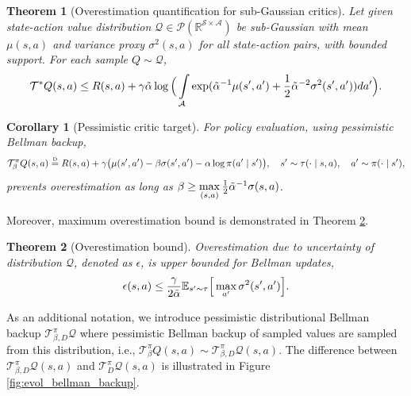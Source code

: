 \documentclass[10pt]{article} %
\newtheorem{theorem}{Theorem}[section]
\newtheorem{corollary}{Corollary}[theorem]
\newcommand\disteq{\mathrel{\stackrel{\makebox[0pt]{\mbox{\normalfont\tiny D}}}{=}}}
\begin{document}
\begin{theorem}[Overestimation quantification for sub-Gaussian critics]
	\label{thm:overestimation}
	Let given state-action value distribution $\mathcal{Q}\in\mathcal{P}(\mathbb{R}^{\mathcal{S}\times\mathcal{A}})$ be sub-Gaussian with mean $\mu(s,a)$ and variance proxy $\sigma^2(s,a)$ for all state-action pairs, with bounded support. For each sample $Q\sim\mathcal{Q}$,  
	\begin{equation}
		\mathcal{T}^{*} Q(s,a) \leq R(s,a) + \gamma \Tilde{\alpha} \log \Big( \int\limits_{\mathcal{A}} \exp( {\Tilde{\alpha}}^{-1} \mu(s',a') + \frac{1}{2} {\Tilde{\alpha}}^{-2} \sigma^2(s',a') ) da' \Big). \\
	\end{equation}
\end{theorem}

\begin{corollary}[Pessimistic critic target]
	\label{cor:pessimism}
	For policy evaluation, using pessimistic Bellman backup, 
	\begin{equation}
		\label{eqn:q_evs_eval_pessimistic}
		\mathcal{T}_{\beta}^{\pi} Q(s,a) \disteq R(s,a) + \gamma \big( \mu(s',a') - \beta \sigma(s',a') - \alpha \log \pi(a' \mid s') \big), \quad s'\sim\tau(\cdot \mid s,a), \quad a' \sim \pi(\cdot \mid s'), 
	\end{equation}
	prevents overestimation as long as $\beta \geq \max\limits_{(s, a)} \frac{1}{2}{\Tilde{\alpha}}^{-1} \sigma(s, a)$. 
\end{corollary}

Moreover, maximum overestimation bound is demonstrated in Theorem \ref{thm:overestimation_bound}.

\begin{theorem}[Overestimation bound]
	\label{thm:overestimation_bound}
	Overestimation due to uncertainty of distribution $\mathcal{Q}$, denoted as $\epsilon$, is upper bounded for Bellman updates, 
	\begin{align}
		\epsilon(s,a) \leq \frac{\gamma}{2\Tilde{\alpha}} \mathbb{E}_{s'\sim\tau} \Big[ \max_{a'} \sigma^2(s',a') \Big]. 
	\end{align} 
\end{theorem}

As an additional notation, we introduce pessimistic distributional Bellman backup $\mathcal{T}_{\beta, D}^{\pi}\mathcal{Q}$ where pessimistic Bellman backup of sampled values are sampled from this distribution, i.e.,  $\mathcal{T}_{\beta}^{\pi} Q(s,a) \sim \mathcal{T}^{\pi}_{\beta, D}\mathcal{Q}(s, a)$. The difference between $\mathcal{T}^{\pi}_{\beta, D}\mathcal{Q}(s, a)$ and $\mathcal{T}^{\pi}_{D}\mathcal{Q}(s, a)$ is illustrated in Figure \ref{fig:evol_bellman_backup}. 
\end{document}
